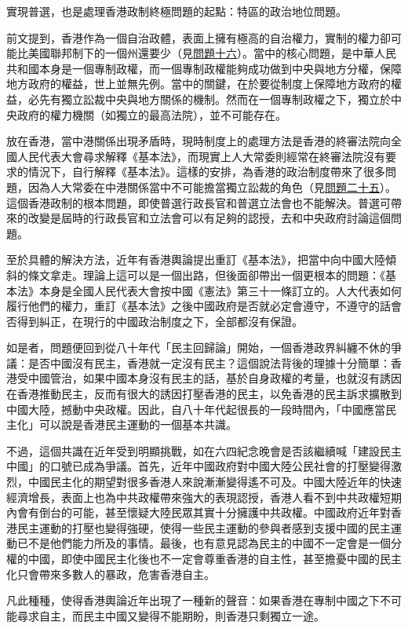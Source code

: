 實現普選，也是處理香港政制終極問題的起點：特區的政治地位問題。

前文提到，香港作為一個自治政體，表面上擁有極高的自治權力，實制的權力卻可能比美國聯邦制下的一個州還要少（見\hyperref[sec:sec16]{問題十六}）。當中的核心問題，是中華人民共和國本身是一個專制政權，而一個專制政權能夠成功做到中央與地方分權，保障地方政府的權益，世上並無先例。當中的關鍵，在於要從制度上保障地方政府的權益，必先有獨立訟裁中央與地方關係的機制。然而在一個專制政權之下，獨立於中央政府的權力機關（如獨立的最高法院），並不可能存在。

放在香港，當中港關係出現矛盾時，現時制度上的處理方法是香港的終審法院向全國人民代表大會尋求解釋《基本法》，而現實上人大常委則經常在終審法院沒有要求的情況下，自行解釋《基本法》。這樣的安排，為香港的政治制度帶來了很多問題，因為人大常委在中港關係當中不可能擔當獨立訟裁的角色（見\hyperref[sec:sec25]{問題二十五}）。這個香港政制的根本問題，即使普選行政長官和普選立法會也不能解決。普選可帶來的改變是屆時的行政長官和立法會可以有足夠的認授，去和中央政府討論這個問題。

至於具體的解決方法，近年有香港輿論提出重訂《基本法》，把當中向中國大陸傾斜的條文拿走。理論上這可以是一個出路，但後面卻帶出一個更根本的問題：《基本法》本身是全國人民代表大會按中國《憲法》第三十一條訂立的。人大代表如何履行他們的權力，重訂《基本法》之後中國政府是否就必定會遵守，不遵守的話會否得到糾正，在現行的中國政治制度之下，全部都沒有保證。

如是者，問題便回到從八十年代「民主回歸論」開始，一個香港政界糾纏不休的爭議：是否中國沒有民主，香港就一定沒有民主？這個說法背後的理據十分簡單：香港受中國管治，如果中國本身沒有民主的話，基於自身政權的考量，也就沒有誘因在香港推動民主，反而有很大的誘因打壓香港的民主，以免香港的民主訴求擴散到中國大陸，撼動中央政權。因此，自八十年代起很長的一段時間內，「中國應當民主化」可以說是香港民主運動的一個基本共識。

不過，這個共識在近年受到明顯挑戰，如在六四紀念晚會是否該繼續喊「建設民主中國」的口號已成為爭議。首先，近年中國政府對中國大陸公民社會的打壓變得激烈，中國民主化的期望對很多香港人來說漸漸變得遙不可及。中國大陸近年的快速經濟增長，表面上也為中共政權帶來強大的表現認授，香港人看不到中共政權短期內會有倒台的可能，甚至懷疑大陸民眾其實十分擁護中共政權。中國政府近年對香港民主運動的打壓也變得強硬，使得一些民主運動的參與者感到支援中國的民主運動已不是他們能力所及的事情。最後，也有意見認為民主的中國不一定會是一個分權的中國，即使中國民主化後也不一定會尊重香港的自主性，甚至擔憂中國的民主化只會帶來多數人的暴政，危害香港自主。

凡此種種，使得香港輿論近年出現了一種新的聲音：如果香港在專制中國之下不可能尋求自主，而民主中國又變得不能期盼，則香港只剩獨立一途。

